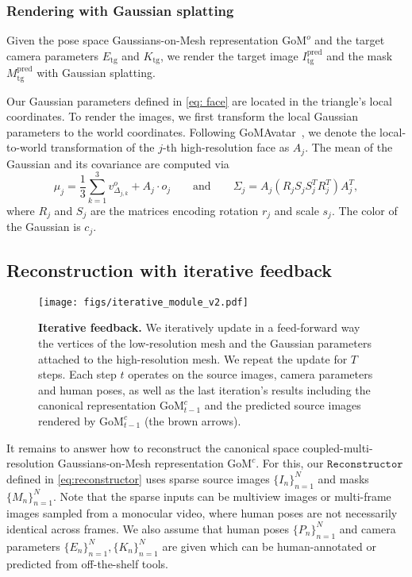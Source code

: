 \subsubsection{Rendering with Gaussian splatting}
\label{sec: gaussian_splatting}
Given the pose space Gaussians-on-Mesh representation $\text{GoM}^o$ and the target camera parameters $E_\text{tg}$ and $K_\text{tg}$, we render the target image $I_\text{tg}^\text{pred}$ and the mask $M_\text{tg}^\text{pred}$ with Gaussian splatting.

Our Gaussian parameters defined in \cref{eq: face} are located in the triangle's local coordinates. To render the images, we first transform the local Gaussian parameters to the world coordinates. Following GoMAvatar~\citep{wen2024gomavatar}, we denote the local-to-world transformation of the $j$-th high-resolution face as $A_j$. The mean of the Gaussian and its covariance are computed via
\begin{equation}
\label{eq: gaussian}
    \mu_j = \frac{1}{3}\sum_{k=1}^3 v_{ \Delta_{j,k}}^o + A_j \cdot o_j 
    \quad\quad\text{and}\quad\quad
    \Sigma_{j} = A_{j} (R_{j} S_{j} S_{j}^T R_{j}^T) A_{j}^T,
\end{equation}
where $R_{j}$ and $S_{j}$ are the matrices encoding rotation $r_{j}$ and scale $s_{j}$. The color of the Gaussian is $c_j$.

\subsection{Reconstruction with iterative feedback}
\label{sec: reconstruction}

\begin{figure}[t]
    \centering
    \texttt{[image: figs/iterative\_module\_v2.pdf]} \vspace{-1cm}
    \caption{\textbf{Iterative feedback.} We iteratively update in a feed-forward way the vertices of the low-resolution mesh and the Gaussian parameters attached to the high-resolution mesh. We repeat the update for $T$ steps. Each step $t$ operates on the source images, camera parameters and human poses, as well as the last iteration's results including the canonical representation $\text{GoM}_{t-1}^c$ and the predicted source images rendered by $\text{GoM}_{t-1}^c$ (the brown arrows).} \vspace{-0.5cm}
    \label{fig:iterative_update}
\end{figure}

It remains to answer how to reconstruct the canonical space coupled-multi-resolution Gaussians-on-Mesh representation $\text{GoM}^c$. %
For this, our $\texttt{Reconstructor}$ defined in \cref{eq:reconstructor} uses sparse source images $\{I_n\}_{n=1}^N$ and masks $\{M_n\}_{n=1}^N$. Note that the sparse inputs can be multiview images or multi-frame images sampled from a monocular video, where human poses are not necessarily identical across frames. We also assume that human poses $\{P_n\}_{n=1}^N$ and camera parameters $\{E_n\}_{n=1}^N, \{K_n\}_{n=1}^N$ are given which can be human-annotated or predicted from off-the-shelf tools. %


